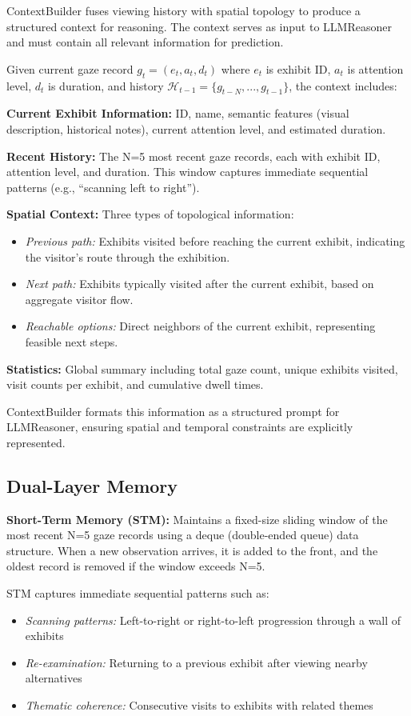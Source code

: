 \documentclass[letterpaper]{article}
\begin{document}
ContextBuilder fuses viewing history with spatial topology to produce a structured context for reasoning. The context serves as input to LLMReasoner and must contain all relevant information for prediction.

Given current gaze record $g_t = (e_t, a_t, d_t)$ where $e_t$ is exhibit ID, $a_t$ is attention level, $d_t$ is duration, and history $\mathcal{H}_{t-1} = \{g_{t-N}, ..., g_{t-1}\}$, the context includes:

\textbf{Current Exhibit Information:} ID, name, semantic features (visual description, historical notes), current attention level, and estimated duration.

\textbf{Recent History:} The N=5 most recent gaze records, each with exhibit ID, attention level, and duration. This window captures immediate sequential patterns (e.g., ``scanning left to right'').

\textbf{Spatial Context:} Three types of topological information:
\begin{itemize}
    \item \textit{Previous path:} Exhibits visited before reaching the current exhibit, indicating the visitor's route through the exhibition.
    \item \textit{Next path:} Exhibits typically visited after the current exhibit, based on aggregate visitor flow.
    \item \textit{Reachable options:} Direct neighbors of the current exhibit, representing feasible next steps.
\end{itemize}

\textbf{Statistics:} Global summary including total gaze count, unique exhibits visited, visit counts per exhibit, and cumulative dwell times.

ContextBuilder formats this information as a structured prompt for LLMReasoner, ensuring spatial and temporal constraints are explicitly represented.

\subsection{Dual-Layer Memory}

\textbf{Short-Term Memory (STM):} Maintains a fixed-size sliding window of the most recent N=5 gaze records using a deque (double-ended queue) data structure. When a new observation arrives, it is added to the front, and the oldest record is removed if the window exceeds N=5.

STM captures immediate sequential patterns such as:
\begin{itemize}
    \item \textit{Scanning patterns:} Left-to-right or right-to-left progression through a wall of exhibits
    \item \textit{Re-examination:} Returning to a previous exhibit after viewing nearby alternatives
    \item \textit{Thematic coherence:} Consecutive visits to exhibits with related themes
\end{itemize}
\end{document}
